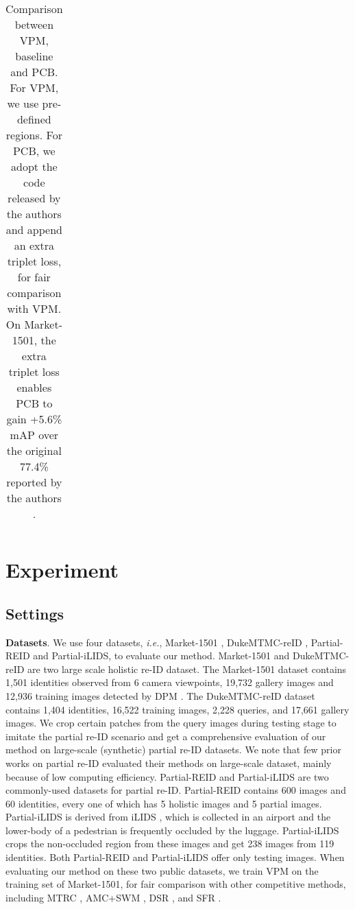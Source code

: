 \documentclass[10pt,twocolumn,letterpaper]{article}
\begin{document}
\begin{table*}[t]
\begin{center}
\begin{tabular}{l|c|ccc c|ccc c|ccc c}
\hline 


\end{tabular}
\caption{Comparison between VPM, baseline and PCB. For VPM, we use  pre-defined regions. For PCB, we adopt the code released by the authors and append an extra triplet loss, for fair comparison with VPM. On Market-1501, the extra triplet loss enables PCB to gain +5.6\% mAP over the original 77.4\% reported by the authors \cite{PCB_ECCV}. }
\label{tab:large}
\end{center}
\end{table*}

\section{Experiment}
\subsection{Settings}
\textbf{Datasets}. We use four datasets, \emph{i.e.}, Market-1501 \cite{DBLP:conf/iccv/ZhengSTWWT15}, DukeMTMC-reID \cite{ristani2016MTMC,zheng2017unlabeled}, Partial-REID and Partial-iLIDS, to evaluate our method. Market-1501 and DukeMTMC-reID are two large scale holistic re-ID dataset. The Market-1501 dataset contains 1,501 identities observed from 6 camera viewpoints, 19,732 gallery images and 12,936 training images detected by DPM \cite{felzenszwalb2008discriminatively}. The DukeMTMC-reID dataset contains 1,404 identities, 16,522 training images, 2,228 queries, and 17,661 gallery images. We crop certain patches from the query images during testing stage to imitate the partial re-ID scenario and get a comprehensive evaluation of our method on large-scale (synthetic)  partial re-ID datasets. We note that few prior works on partial re-ID evaluated their methods on large-scale dataset, mainly because of low computing efficiency. Partial-REID \cite{DBLP:conf/iccv/ZhengLXLLG15} and Partial-iLIDS \cite{DBLP:conf/cvpr/ZhengGX11} are two commonly-used datasets for partial re-ID. Partial-REID contains 600 images and 60 identities, every one of which has 5 holistic images and 5 partial images. Partial-iLIDS is derived from iLIDS \cite{DBLP:conf/eccv/WangGZW14}, which is collected in an airport and the lower-body of a pedestrian is frequently occluded by the luggage. Partial-iLIDS crops the non-occluded region from these images and get 238 images from 119 identities. Both Partial-REID and Partial-iLIDS offer only testing images. When evaluating our method on these two public datasets, we train VPM on the training set of Market-1501, for fair comparison with other competitive methods, including MTRC \cite{DBLP:journals/pami/LiaoJL13}, AMC+SWM \cite{DBLP:conf/iccv/ZhengLXLLG15}, DSR \cite{HeLX2018Partial}, and SFR \cite{DBLP:journals/corr/abs-1810-07399}.
\end{document}
